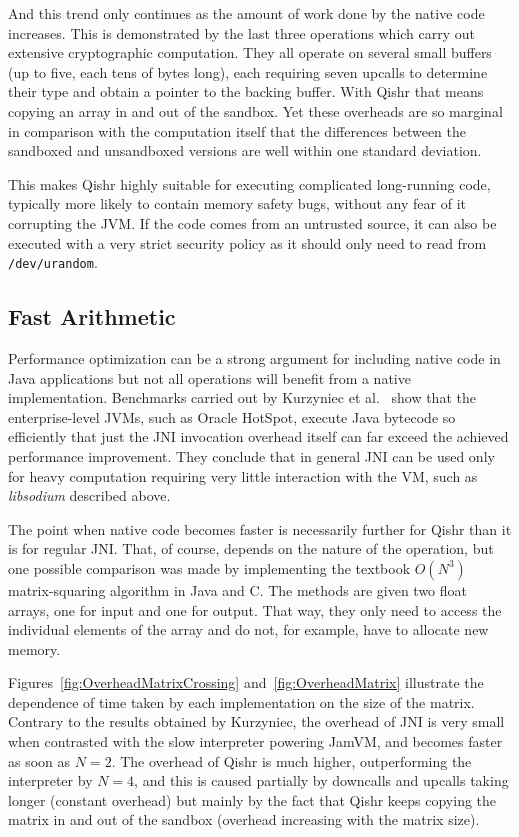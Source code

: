 \documentclass[a4paper,12pt,twoside,openright]{report}
\newcommand{\tool}[1]{\emph{#1}}
\newcommand{\lib}[1]{\tool{lib#1}}
\begin{document}
And this trend only continues as the amount of work done by the native code increases. This is demonstrated by the last three operations which carry out extensive cryptographic computation. They all operate on several small buffers (up to five, each tens of bytes long), each requiring seven upcalls to determine their type and obtain a pointer to the backing buffer. With Qishr that means copying an array in and out of the sandbox. Yet these overheads are so marginal in comparison with the computation itself that the differences between the sandboxed and unsandboxed versions are well within one standard deviation. 

This makes Qishr highly suitable for executing complicated long-running code, typically more likely to contain memory safety bugs, without any fear of it corrupting the JVM. If the code comes from an untrusted source, it can also be executed with a very strict security policy as it should only need to read from \texttt{/dev/urandom}.

\subsection{Fast Arithmetic}

Performance optimization can be a strong argument for including native code in Java applications but not all operations will benefit from a native implementation. Benchmarks carried out by Kurzyniec et al.~\cite{Kurzyniec01efficientcooperation} show that the enterprise-level JVMs, such as Oracle HotSpot, execute Java bytecode so efficiently that just the JNI invocation overhead itself can far exceed the achieved performance improvement. They conclude that in general JNI can be used only for heavy computation requiring very little interaction with the VM, such as \lib{sodium} described above. 

The point when native code becomes faster is necessarily further for Qishr than it is for regular JNI. That, of course, depends on the nature of the operation, but one possible comparison was made by implementing the textbook $O(N^3)$ matrix-squaring algorithm in Java and C. The methods are given two float arrays, one for input and one for output. That way, they only need to access the individual elements of the array and do not, for example, have to allocate new memory. 

Figures~\ref{fig:OverheadMatrixCrossing} and~\ref{fig:OverheadMatrix} illustrate the dependence of time taken by each implementation on the size of the matrix. Contrary to the results obtained by Kurzyniec, the overhead of JNI is very small when contrasted with the slow interpreter powering JamVM, and becomes faster as soon as $N=2$. The overhead of Qishr is much higher, outperforming the interpreter by $N = 4$, and this is caused partially by downcalls and upcalls taking longer (constant overhead) but mainly by the fact that Qishr keeps copying the matrix in and out of the sandbox (overhead increasing with the matrix size).
\end{document}
